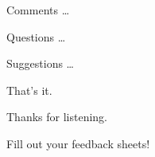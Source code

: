 \documentclass{beamer}
\begin{document}
\begin{frame}
\Huge{\centerline{Comments \dots}}
\Huge{\centerline{Questions \dots}}
\Huge{\centerline{Suggestions \dots}}
\end{frame}


\begin{frame}
\Huge{\centerline{That's it.}}
\Huge{\centerline{Thanks for listening.}}
\vspace{20pt}
\large{\centerline{Fill out your feedback sheets!}}
\end{frame}

\end{document}

